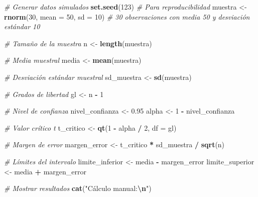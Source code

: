 \documentclass[
]{article}
\newenvironment{Shaded}{\begin{snugshade}}{\end{snugshade}}
\newcommand{\AttributeTok}[1]{\textcolor[rgb]{0.13,0.29,0.53}{#1}}
\newcommand{\CommentTok}[1]{\textcolor[rgb]{0.56,0.35,0.01}{\textit{#1}}}
\newcommand{\DecValTok}[1]{\textcolor[rgb]{0.00,0.00,0.81}{#1}}
\newcommand{\FloatTok}[1]{\textcolor[rgb]{0.00,0.00,0.81}{#1}}
\newcommand{\FunctionTok}[1]{\textcolor[rgb]{0.13,0.29,0.53}{\textbf{#1}}}
\newcommand{\NormalTok}[1]{#1}
\newcommand{\OtherTok}[1]{\textcolor[rgb]{0.56,0.35,0.01}{#1}}
\newcommand{\SpecialCharTok}[1]{\textcolor[rgb]{0.81,0.36,0.00}{\textbf{#1}}}
\newcommand{\StringTok}[1]{\textcolor[rgb]{0.31,0.60,0.02}{#1}}
\begin{document}
\begin{Shaded}
\begin{Highlighting}[]
\CommentTok{\# Generar datos simulados}
\FunctionTok{set.seed}\NormalTok{(}\DecValTok{123}\NormalTok{)  }\CommentTok{\# Para reproducibilidad}
\NormalTok{muestra }\OtherTok{\textless{}{-}} \FunctionTok{rnorm}\NormalTok{(}\DecValTok{30}\NormalTok{, }\AttributeTok{mean =} \DecValTok{50}\NormalTok{, }\AttributeTok{sd =} \DecValTok{10}\NormalTok{)  }\CommentTok{\# 30 observaciones con media 50 y desviación estándar 10}

\CommentTok{\# Tamaño de la muestra}
\NormalTok{n }\OtherTok{\textless{}{-}} \FunctionTok{length}\NormalTok{(muestra)}

\CommentTok{\# Media muestral}
\NormalTok{media }\OtherTok{\textless{}{-}} \FunctionTok{mean}\NormalTok{(muestra)}

\CommentTok{\# Desviación estándar muestral}
\NormalTok{sd\_muestra }\OtherTok{\textless{}{-}} \FunctionTok{sd}\NormalTok{(muestra)}

\CommentTok{\# Grados de libertad}
\NormalTok{gl }\OtherTok{\textless{}{-}}\NormalTok{ n }\SpecialCharTok{{-}} \DecValTok{1}

\CommentTok{\# Nivel de confianza}
\NormalTok{nivel\_confianza }\OtherTok{\textless{}{-}} \FloatTok{0.95}
\NormalTok{alpha }\OtherTok{\textless{}{-}} \DecValTok{1} \SpecialCharTok{{-}}\NormalTok{ nivel\_confianza}

\CommentTok{\# Valor crítico t}
\NormalTok{t\_critico }\OtherTok{\textless{}{-}} \FunctionTok{qt}\NormalTok{(}\DecValTok{1} \SpecialCharTok{{-}}\NormalTok{ alpha }\SpecialCharTok{/} \DecValTok{2}\NormalTok{, }\AttributeTok{df =}\NormalTok{ gl)}

\CommentTok{\# Margen de error}
\NormalTok{margen\_error }\OtherTok{\textless{}{-}}\NormalTok{ t\_critico }\SpecialCharTok{*}\NormalTok{ sd\_muestra }\SpecialCharTok{/} \FunctionTok{sqrt}\NormalTok{(n)}

\CommentTok{\# Límites del intervalo}
\NormalTok{limite\_inferior }\OtherTok{\textless{}{-}}\NormalTok{ media }\SpecialCharTok{{-}}\NormalTok{ margen\_error}
\NormalTok{limite\_superior }\OtherTok{\textless{}{-}}\NormalTok{ media }\SpecialCharTok{+}\NormalTok{ margen\_error}

\CommentTok{\# Mostrar resultados}
\FunctionTok{cat}\NormalTok{(}\StringTok{"Cálculo manual:}\SpecialCharTok{\textbackslash{}n}\StringTok{"}\NormalTok{)}
\end{Highlighting}
\end{Shaded}
\end{document}
